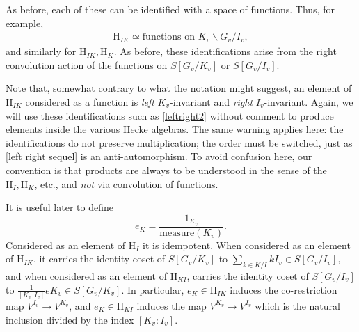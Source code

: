 \documentclass[10pt]{amsart}
\newcommand{\Hom}{\mathrm{Hom}}
\theoremstyle{remark}
\begin{document}
{As before, each of these can be identified with a space of functions. Thus, for example, 
 \begin{eqnarray} \label{leftright2} \mathrm{H}_{IK} \simeq \mbox{functions on $K_v \backslash G_v/I_v$},    \end{eqnarray}
 and similarly for $\mathrm{H}_{IK}, \mathrm{H}_K$. 
As before, these identifications  arise  from the right convolution action of the functions
  on $S[G_v/K_v]$ or $S[G_v/I_v]$.  
  
 Note that, somewhat contrary to what the notation might suggest,  an element of $\mathrm{H}_{IK}$
  considered as a function is {\em left} $K_v$-invariant and {\em right} $I_v$-invariant.         Again, we will use these identifications such as \eqref{leftright2} without comment to produce
  elements inside the various Hecke algebras. The same warning applies here: the identifications do not preserve multiplication; the order
  must be switched, just as \eqref{left right sequel} is an anti-automorphism.  To avoid confusion here, our convention is that products are always to be understood
  in the sense of the $\mathrm{H}_I, \mathrm{H}_K$, etc., and {\em not} via convolution of functions. 
 


  

  
  
It is useful later to define  
\begin{equation} \label{eK definition} e_K = \frac{1_{K_v}}{\mathrm{measure}(K_v)}.\end{equation}
Considered as an element of $\mathrm{H}_I$ it  is idempotent. 
When  considered as an element of $\mathrm{H}_{IK}$, it carries the identity coset of $S[G_v/K_v]$ to 
  $\sum_{k \in K/I} k I_v \in S[G_v/I_v]$, and when considered as an element of $\mathrm{H}_{KI}$, carries the identity coset of $S[G_v/I_v]$
  to $\frac{1}{[K_v:I_v]} eK_v \in S[G_v/K_v]$. In particular, $e_K \in \mathrm{H}_{IK}$ induces the co-restriction  map $V^{I_v} \rightarrow V^{K_v}$,
  and $e_K \in \mathrm{H}_{KI}$ induces the map $V^{K_v} \rightarrow V^{I_v}$ which is the natural inclusion divided by the index $[K_v:I_v]$. 
   }
  
  
 
% 

\end{document}

